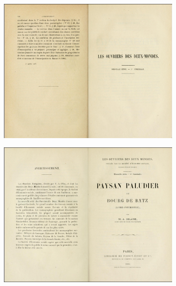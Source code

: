 \begin{figure}[t]
    \centering
    \begin{subfigure}[t]{0.4\textwidth}
     \includegraphics[width=1\linewidth]{img/odm47_ia_1.png}
     \caption{}
     \label{odm47ia1}
    \end{subfigure}
    \hspace{5pt}
    \begin{subfigure}[t]{0.4\textwidth}
     \includegraphics[width=1\linewidth]{img/odm47_ia_2.png}
     \caption{}
     \label{odm47ia2}
    \end{subfigure}
    \hspace{5pt}
    

\end{figure}
